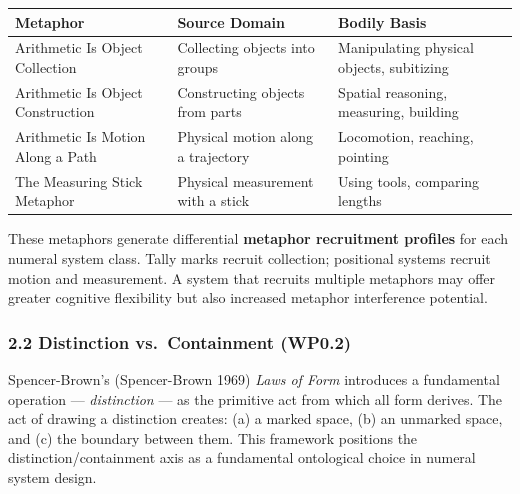 \documentclass[
]{article}
\newcounter{none} %
\begin{document}
{\def\LTcaptype{none} %
\begin{longtable}[]{@{}
  >{\raggedright\arraybackslash}p{}
  >{\raggedright\arraybackslash}p{}
  >{\raggedright\arraybackslash}p{}@{}}
\toprule\noalign{}
\begin{minipage}[b]{\linewidth}\raggedright
Metaphor
\end{minipage} & \begin{minipage}[b]{\linewidth}\raggedright
Source Domain
\end{minipage} & \begin{minipage}[b]{\linewidth}\raggedright
Bodily Basis
\end{minipage} \\
\midrule\noalign{}
\endhead
\bottomrule\noalign{}
\endlastfoot
Arithmetic Is Object Collection & Collecting objects into groups &
Manipulating physical objects, subitizing \\
Arithmetic Is Object Construction & Constructing objects from parts &
Spatial reasoning, measuring, building \\
Arithmetic Is Motion Along a Path & Physical motion along a trajectory &
Locomotion, reaching, pointing \\
The Measuring Stick Metaphor & Physical measurement with a stick & Using
tools, comparing lengths \\
\end{longtable}
}

These metaphors generate differential \textbf{metaphor recruitment
profiles} for each numeral system class. Tally marks recruit collection;
positional systems recruit motion and measurement. A system that
recruits multiple metaphors may offer greater cognitive flexibility but
also increased metaphor interference potential.

\subsubsection{2.2 Distinction vs.~Containment
(WP0.2)}\label{distinction-vs.-containment-wp0.2}

Spencer-Brown's (Spencer-Brown 1969) \emph{Laws of Form} introduces a
fundamental operation --- \emph{distinction} --- as the primitive act
from which all form derives. The act of drawing a distinction creates:
(a) a marked space, (b) an unmarked space, and (c) the boundary between
them. This framework positions the distinction/containment axis as a
fundamental ontological choice in numeral system design.
\end{document}
